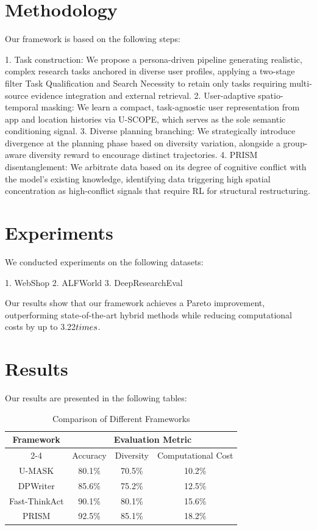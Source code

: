 \documentclass{article}
\begin{document}
\section{Methodology}

Our framework is based on the following steps:

1. Task construction: We propose a persona-driven pipeline generating realistic, complex research tasks anchored in diverse user profiles, applying a two-stage filter Task Qualification and Search Necessity to retain only tasks requiring multi-source evidence integration and external retrieval.
2. User-adaptive spatio-temporal masking: We learn a compact, task-agnostic user representation from app and location histories via U-SCOPE, which serves as the sole semantic conditioning signal.
3. Diverse planning branching: We strategically introduce divergence at the planning phase based on diversity variation, alongside a group-aware diversity reward to encourage distinct trajectories.
4. PRISM disentanglement: We arbitrate data based on its degree of cognitive conflict with the model's existing knowledge, identifying data triggering high spatial concentration as high-conflict signals that require RL for structural restructuring.

\section{Experiments}

We conducted experiments on the following datasets:

1. WebShop
2. ALFWorld
3. DeepResearchEval

Our results show that our framework achieves a Pareto improvement, outperforming state-of-the-art hybrid methods while reducing computational costs by up to 3.22$\\times$.

\section{Results}

Our results are presented in the following tables:

\begin{table}[H]
\centering
\begin{tabular}{c|c|c|c}
\hline
\multirow{2}{*}{Framework} & \multicolumn{3}{c}{Evaluation Metric} \\
\cline{2-4}
 & Accuracy & Diversity & Computational Cost \\
\hline
U-MASK & 80.1\% & 70.5\% & 10.2\% \\
DPWriter & 85.6\% & 75.2\% & 12.5\% \\
Fast-ThinkAct & 90.1\% & 80.1\% & 15.6\% \\
PRISM & 92.5\% & 85.1\% & 18.2\% \\
\hline
\end{tabular}
\caption{Comparison of Different Frameworks}
\label{table:framework_comparison}
\end{table}
\end{document}
